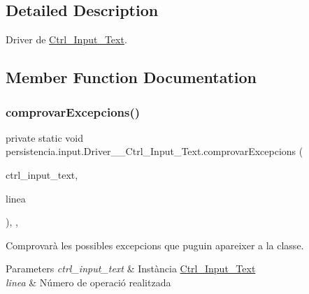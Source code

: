 \subsection{Detailed Description}
Driver de \hyperlink{classpersistencia_1_1input_1_1Ctrl__Input__Text}{Ctrl\+\_\+\+Input\+\_\+\+Text}. 

\subsection{Member Function Documentation}
\mbox{\label{classpersistencia_1_1input_1_1Driver____Ctrl__Input__Text_a3e4149adb11b97b330ce77f1c2b5ae9c}} 
\subsubsection{\texorpdfstring{comprovar\+Excepcions()}{comprovarExcepcions()}}
{\footnotesize\ttfamily private static void persistencia.\+input.\+Driver\+\_\+\+\_\+\+Ctrl\+\_\+\+Input\+\_\+\+Text.\+comprovar\+Excepcions (\begin{DoxyParamCaption}\item[{\hyperlink{classpersistencia_1_1input_1_1Ctrl__Input__Text}{Ctrl\+\_\+\+Input\+\_\+\+Text}}]{ctrl\+\_\+input\+\_\+text,  }\item[{String}]{linea }\end{DoxyParamCaption})\hspace{0.3cm}{\ttfamily [inline]}, {\ttfamily [static]}, {\ttfamily [private]}}



Comprovarà les possibles excepcions que puguin apareixer a la classe. 


\begin{DoxyParams}{Parameters}
{\em ctrl\+\_\+input\+\_\+text} & Instància \hyperlink{classpersistencia_1_1input_1_1Ctrl__Input__Text}{Ctrl\+\_\+\+Input\+\_\+\+Text} \\
\hline
{\em linea} & Número de operació realitzada \\
\hline
\end{DoxyParams}


